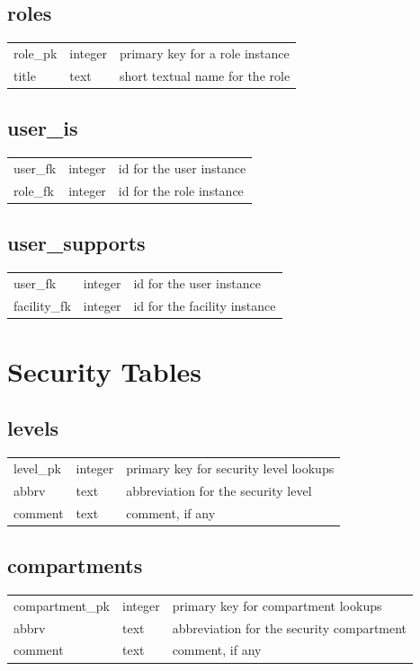 \subsection*{roles}
\begin{tabular}{l|l|l}
\hline
role\_pk & integer & primary key for a role instance \\
title & text & short textual name for the role \\
\hline
\end{tabular}

\subsection*{user\_is}
\begin{tabular}{l|l|l}
\hline
user\_fk & integer & id for the user instance \\
role\_fk & integer & id for the role instance \\
\hline
\end{tabular}

\subsection*{user\_supports}
\begin{tabular}{l|l|l}
\hline
user\_fk & integer & id for the user instance \\
facility\_fk & integer & id for the facility instance \\
\hline
\end{tabular}


\section*{Security Tables}

\subsection*{levels}
\begin{tabular}{l|l|l}
\hline
level\_pk & integer & primary key for security level lookups \\
abbrv & text & abbreviation for the security level \\
comment & text & comment, if any \\
\hline
\end{tabular}

\subsection*{compartments}
\begin{tabular}{l|l|l}
\hline
compartment\_pk & integer & primary key for compartment lookups \\
abbrv & text & abbreviation for the security compartment \\
comment & text & comment, if any \\
\hline
\end{tabular}

